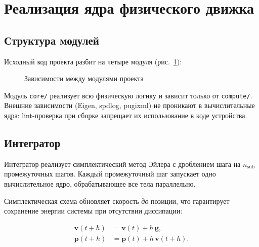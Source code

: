 \section{Реализация ядра физического движка}

\subsection{Структура модулей}

Исходный код проекта разбит на четыре модуля (рис.~\ref{fig:module_arch}):

\begin{figure}[h]
\centering
{}
\caption{Зависимости между модулями проекта}
\label{fig:module_arch}
\end{figure}

Модуль \texttt{core/} реализует всю физическую логику и зависит только от \texttt{compute/}. Внешние 
зависимости (Eigen, spdlog, pugixml) не проникают в вычислительные ядра: lint-проверка при сборке запрещает их
использование в коде устройства.

\subsection{Интегратор}

Интегратор реализует симплектический метод Эйлера с дроблением шага на $n_{\text{sub}}$ промежуточных шагов. 
Каждый промежуточный шаг запускает одно вычислительное ядро, обрабатывающее все тела параллельно.

Симплектическая схема обновляет скорость \textit{до} позиции,
что гарантирует сохранение энергии системы при отсутствии диссипации:

\begin{align}
  \mathbf{v}(t + h) &= \mathbf{v}(t) + h\,\mathbf{g}, \\
  \mathbf{p}(t + h) &= \mathbf{p}(t) + h\,\mathbf{v}(t + h).
\end{align}

